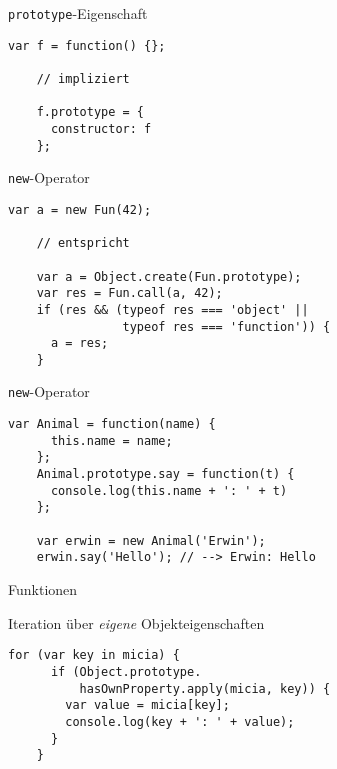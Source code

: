 \begin{frame}[fragile]{\lstinline-prototype--Eigenschaft}
  \begin{lstlisting}[gobble=4]
    var f = function() {};
    
    // impliziert
    
    f.prototype = {
      constructor: f
    };
  \end{lstlisting}
\end{frame}

\begin{frame}[fragile]{\lstinline-new--Operator}
  \begin{lstlisting}[gobble=4]
    var a = new Fun(42);

    // entspricht  
  
    var a = Object.create(Fun.prototype);
    var res = Fun.call(a, 42);
    if (res && (typeof res === 'object' ||
                typeof res === 'function')) {
      a = res;
    }
  \end{lstlisting}
\end{frame}

\begin{frame}[fragile]{\lstinline-new--Operator}
  \begin{lstlisting}[gobble=4]
    var Animal = function(name) {
      this.name = name;
    };
    Animal.prototype.say = function(t) {
      console.log(this.name + ': ' + t)
    };
    
    var erwin = new Animal('Erwin');
    erwin.say('Hello'); // --> Erwin: Hello
  \end{lstlisting}
\end{frame}

\begin{frame}{Funktionen}
  \begin{center}
  \end{center}
\end{frame}

\begin{frame}[fragile]{Iteration über \emph{eigene} Objekteigenschaften}
  \begin{lstlisting}[gobble=4]
    for (var key in micia) {
      if (Object.prototype.
          hasOwnProperty.apply(micia, key)) {
        var value = micia[key];
        console.log(key + ': ' + value);
      }
    }
  \end{lstlisting}
\end{frame}

